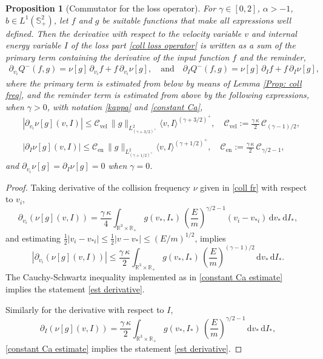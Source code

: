 \documentclass[11pt,a4paper]{amsart}
\newcommand{\bRp}{\mathbb{R}_+}
\newcommand{\bRfp}{\mathbb{R}^3 \times \bRp}
\newcommand{\bSp}{\mathbb{S}^2_+}
\newcommand{\md}{\mathrm{d}}
\newcommand{\g}{\gamma}
\newcommand{\la}{\langle}
\newcommand{\ra}{\rangle}
\newcommand{\E}{\left(\frac{E}{m}\right)}
\newcommand{\cb}{\mathcal{C}}
\newcommand{\R}{\mathcal{R}}
\newcommand{\Prim}{\mathcal{P}}
\newcommand{\Clvel}{\mathcal{C}_{\text{vel}}}
\newcommand{\Clen}{\mathcal{C}_{\text{en}}}
\newtheorem{proposition}[theorem]{Proposition}
\begin{document}
\begin{proposition}[Commutator for the loss operator]\label{inc-loss-reg-b1}
	For $\gamma\in[0,2]$, $\alpha> -1$, $b\in L^{1}(\bSp)$, let $f$ and $g$ be suitable functions  that make all expressions well defined.  Then the derivative with respect to the velocity variable $v$ and   internal energy variable $I$ of the loss part \eqref{coll loss operator}  is written as a sum of the primary term  containing the derivative of the input function $f$ and the reminder,
	\begin{equation}\label{der Q- wrt vi}
		\begin{split}
		\partial_{v_i} 	Q^-(f,g) = \nu[g] \, \partial_{v_i} f +f  \, \partial_{v_i} \nu[g], %
	\quad \text{and} \quad
			\partial_{I} 	Q^-(f,g) = \nu[g] \, \partial_{I} f +f  \, \partial_{I} \nu[g],
		\end{split}
	\end{equation}
where the primary term is estimated from below by means of Lemma \ref{Prop: coll freq}, and the reminder term is estimated  from above by the following expressions, when $\g>0$,  with notation 
\eqref{kappa} and \eqref{constant Ca},
	\begin{align}
& |\partial_{v_i} \nu[g](v,I)  | \leq \Clvel \, 	\| g \|_{L^{2}_{(\g+3/2)^+}}  \la v, I \ra^{(\g+3/2)^+},  \quad \Clvel :=  \frac{\g \, \kappa}{2}  \, \cb_{(\g -1)/2}, \label{est derivative} \\
 & |\partial_{I} \nu[g](v,I)  | \leq \Clen \,	\| g \|_{L^{2}_{(\g+1/2)^+}}  \la v, I \ra^{(\g+1/2)^+}, \quad \Clen :=  \frac{\g \, \kappa}{2}  \, \cb_{\g/2 -1}, \label{est derivative energy}
	\end{align}
and  $\partial_{v_i} \nu[g] = \partial_{I}\nu[g] =0$ when $\g=0$.
\end{proposition}
\begin{proof} Taking derivative of the collision frequency $\nu$ given in  \eqref{coll fr} with respect to $v_i$,
\begin{equation}
\partial_{v_i} \left(	\nu[g](v,I) \right) = \frac{\g \, \kappa}{4}    \int_{\bRfp}   g(v_*, I_*) \,   \E^{\g/2-1}  (v_i - v_{*i})  \, \md v_* \, \md I_*,
\end{equation}
and estimating  $\frac{1}{2}|v_i-v_{*i}|\leq \frac{1}{2}|v-v_{*}|\leq (E/m)^{1/2}$, implies
\begin{equation}
|	\partial_{v_i} \left(	\nu[g](v,I) \right) | \leq \frac{\g \, \kappa }{2}   \int_{\bRfp}   g(v_*, I_*) \,   \E^{(\g-1)/2}    \, \md v_* \, \md I_*.
\end{equation}
The Cauchy-Schwartz inequality implemented as in \eqref{constant Ca estimate}  implies  the statement \eqref{est derivative}.

Similarly for the derivative   with respect to $I$,
\begin{equation}
	\partial_{I} \left(	\nu[g](v,I) \right) = \frac{\g \, \kappa}{2}     \int_{\bRfp}   g(v_*, I_*) \,   \E^{\g/2-1}    \, \md v_* \, \md I_*,
\end{equation}
\eqref{constant Ca estimate}  implies  the statement \eqref{est derivative}.
\end{proof}
\end{document}
